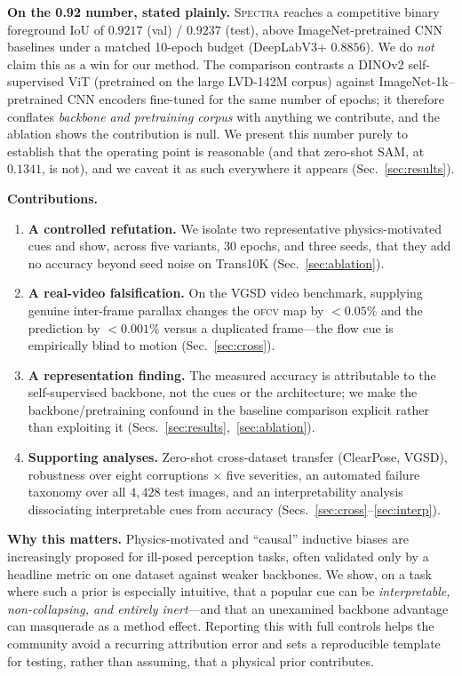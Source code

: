 \documentclass{article}
\newcommand{\spectra}{\textsc{Spectra}}
\newcommand{\ofcv}{\textsc{ofcv}}
\newcommand{\dinov}{DINOv2}
\newcommand{\iou}{IoU}
\begin{document}
\textbf{On the 0.92 number, stated plainly.} \spectra{} reaches a competitive
binary foreground \iou{} of $0.9217$ (val) / $0.9237$ (test), above
ImageNet-pretrained CNN baselines under a matched 10-epoch budget
(DeepLabV3+ $0.8856$). We do \emph{not} claim this as a win for our method. The
comparison contrasts a \dinov{} self-supervised ViT (pretrained on the large
LVD-142M corpus) against ImageNet-1k--pretrained CNN encoders fine-tuned for the
same number of epochs; it therefore conflates \emph{backbone and pretraining
corpus} with anything we contribute, and the ablation shows the contribution is
null. We present this number purely to establish that the operating point is
reasonable (and that zero-shot SAM, at $0.1341$, is not), and we caveat it as
such everywhere it appears (Sec.~\ref{sec:results}).

\textbf{Contributions.}
\begin{enumerate}
\item \textbf{A controlled refutation.} We isolate two representative
physics-motivated cues and show, across five variants, 30 epochs, and three
seeds, that they add no accuracy beyond seed noise on Trans10K
(Sec.~\ref{sec:ablation}).
\item \textbf{A real-video falsification.} On the VGSD video benchmark, supplying
genuine inter-frame parallax changes the \ofcv{} map by $<0.05\%$ and the
prediction by $<0.001\%$ versus a duplicated frame---the flow cue is empirically
blind to motion (Sec.~\ref{sec:cross}).
\item \textbf{A representation finding.} The measured accuracy is attributable to
the self-supervised backbone, not the cues or the architecture; we make the
backbone/pretraining confound in the baseline comparison explicit rather than
exploiting it (Secs.~\ref{sec:results},~\ref{sec:ablation}).
\item \textbf{Supporting analyses.} Zero-shot cross-dataset transfer (ClearPose,
VGSD), robustness over eight corruptions $\times$ five severities, an automated
failure taxonomy over all $4{,}428$ test images, and an interpretability
analysis dissociating interpretable cues from accuracy
(Secs.~\ref{sec:cross}--\ref{sec:interp}).
\end{enumerate}

\textbf{Why this matters.} Physics-motivated and ``causal'' inductive biases are
increasingly proposed for ill-posed perception tasks, often validated only by a
headline metric on one dataset against weaker backbones. We show, on a task
where such a prior is especially intuitive, that a popular cue can be
\emph{interpretable, non-collapsing, and entirely inert}---and that an
unexamined backbone advantage can masquerade as a method effect. Reporting this
with full controls helps the community avoid a recurring attribution error and
sets a reproducible template for testing, rather than assuming, that a physical
prior contributes.
\end{document}
